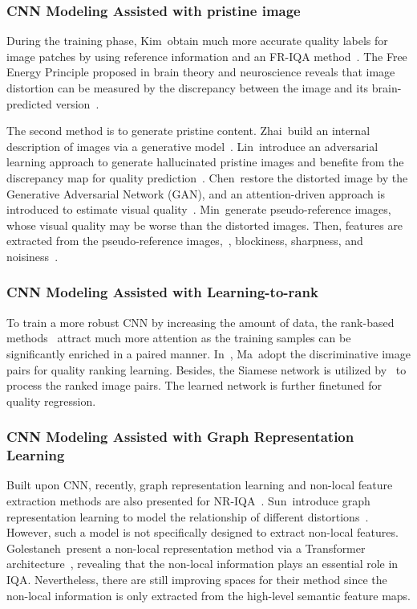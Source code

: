 	\subsubsection{CNN Modeling Assisted with pristine image}
	During the training phase, Kim~\etal obtain much more accurate quality labels for image patches by using reference information and an FR-IQA method~\citep{kim2016fully}. The Free Energy Principle proposed in brain theory and neuroscience reveals that image distortion can be measured by the discrepancy between the image and its brain-predicted version~\citep{friston2010free, friston2006free}. 
	
	The second method is to generate pristine content. Zhai~\etal build an internal description of images via a generative model~\citep{Zhai2012}. Lin~\etal introduce an adversarial learning approach to generate hallucinated pristine images and benefite from the discrepancy map for quality prediction~\citep{lin2018hallucinated}. Chen~\etal restore the distorted image by the Generative Adversarial Network (GAN), and an attention-driven approach is introduced to estimate visual quality~\citep{chen2020no, goodfellow2020generative}. Min~\etal generate pseudo-reference images, whose visual quality may be worse than the distorted images. Then, features are extracted from the pseudo-reference images,~\eg, blockiness, sharpness, and noisiness~\citep{min2017blind}.
	
	\subsubsection{CNN Modeling Assisted with Learning-to-rank}
	To train a more robust CNN by increasing the amount of data, the rank-based methods~\citep{ma2017dipiq, liu2017rankiqa, Ma2016Ranking, Xu2017Ranking} attract much more attention as the training samples can be significantly enriched in a paired manner. In~\citep{ma2017dipiq}, Ma~\etal adopt the discriminative image pairs for quality ranking learning. Besides, the Siamese network is utilized by~\citep{liu2017rankiqa} to process the ranked image pairs. The learned network is further finetuned for quality regression.
	
	\subsubsection{CNN Modeling Assisted with Graph Representation Learning}
	Built upon CNN, recently, graph representation learning and non-local feature extraction methods are also presented for NR-IQA~\citep{sun2022graphiqa, golestaneh2021no}. Sun~\etal introduce graph representation learning to model the relationship of different distortions~\citep{sun2022graphiqa}. However, such a model is not specifically designed to extract non-local features. Golestaneh~\etal present a non-local representation method via a Transformer architecture~\citep{golestaneh2021no}, revealing that the non-local information plays an essential role in IQA. Nevertheless, there are still improving spaces for their method since the non-local information is only extracted from the high-level semantic feature maps.
	
